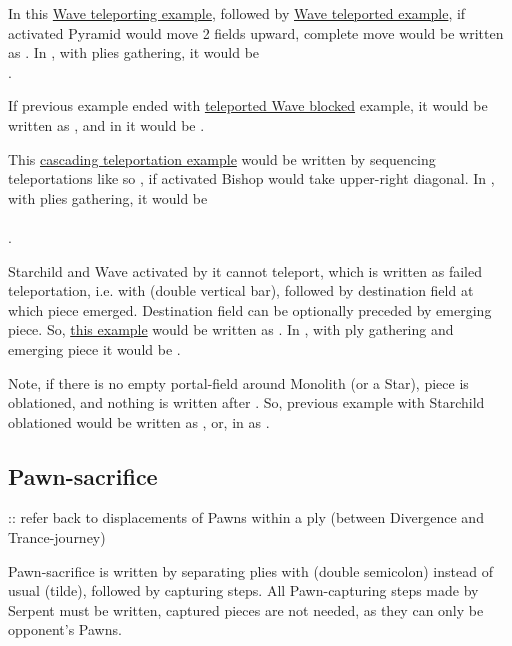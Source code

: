 In this \hyperref[fig:scn_n_04_teleport_move_3]{Wave teleporting example}, followed by
\hyperref[fig:scn_n_05_teleport_end]{Wave teleported example}, if activated Pyramid would
move 2 fields upward, complete move would be written as \newline
{}. In , with plies gathering, it would be \\
\alg{[Gi11-g15]\~{}[Wg15-a18]|[Wr1-l4]\~{}[Al4-l6]}.

If previous example ended with
\hyperref[fig:scn_n_06_teleport_wave_blocked]{teleported Wave blocked} example, it would be
written as , and in  it would be
\alg{[Gi11-g15]\~{}[Wg15-a18]||}.

This \hyperref[fig:scn_d_17_teleporting_wave_cascade]{cascading teleportation example} would
be written by sequencing teleportations like so , if activated
Bishop would take upper-right diagonal. In , with plies gathering, it would be \\
\alg{[Gj6-h2]\~{}[Wh2-b4]|[Wm18-a24]|[Wx1-r4]\~{}}\\
\alg{[Br4-t6]}.

Starchild and Wave activated by it cannot teleport, which is written as failed teleportation,
i.e. with \alg{||} (double vertical bar), followed by destination field at which piece emerged.
Destination field can be optionally preceded by emerging piece. So,
\hyperref[fig:scn_o_07_starchild_not_moving_monolith_init]{this example} would be written as
. In , with ply gathering and emerging piece it would be
.

Note, if there is no empty portal-field around Monolith (or a Star), piece is oblationed, and
nothing is written after \alg{||}. So, previous example with Starchild oblationed would be
written as , or, in  as \alg{[If5-c3]||}.

\subsection*{Pawn-sacrifice}
\label{sec:Appendix/Notation/Pawn-sacrifice}

\TODO :: refer back to displacements of Pawns within a ply (between Divergence and Trance-journey)

Pawn-sacrifice is written by separating plies with \alg{;;} (double semicolon) instead of
usual \alg{\~{}} (tilde), followed by capturing steps. All Pawn-capturing steps made by
Serpent must be written, captured pieces are not needed, as they can only be opponent's
Pawns.

